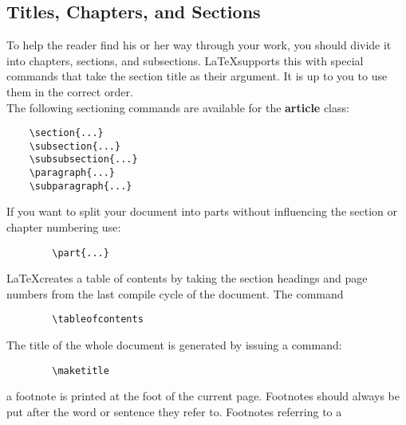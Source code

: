 	\subsection{Titles, Chapters, and Sections}
	To help the reader find his or her way through your work, you should divide it into chapters, sections, and subsections. \LaTeX supports this with special commands that take the section title as their argument. It is up to you to use them in the correct order.\\
	The following sectioning commands are available for the \textbf{article} class:
	\begin{verbatim}
	\section{...}
	\subsection{...}
	\subsubsection{...}
	\paragraph{...}
	\subparagraph{...}
	\end{verbatim}
	If you want to split your document into parts without influencing the section or chapter numbering use:
	\begin{verbatim}
		\part{...}
	\end{verbatim}
	\LaTeX creates a table of contents by taking the section headings and page
	numbers from the last compile cycle of the document. The command
	\begin{verbatim}
		\tableofcontents
	\end{verbatim}
	The title of the whole document is generated by issuing a command:
	\begin{verbatim}
		\maketitle
	\end{verbatim}
	a footnote is printed at the foot of the current page. Footnotes should always
	be put after the word or sentence they refer to. Footnotes referring to a
